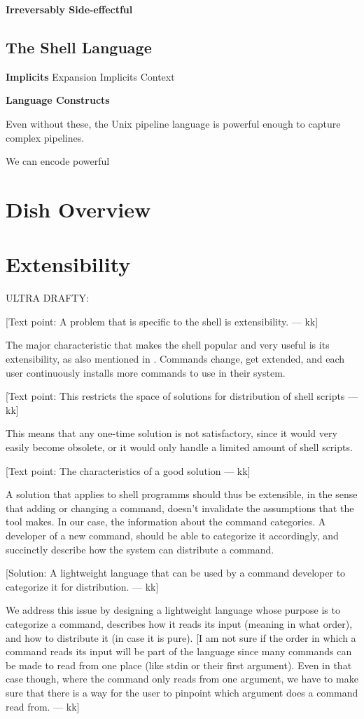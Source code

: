 \documentclass[sigplan,10pt,review,anonymous]{acmart}
\newcommand{\heading}[1]{\vspace{4pt}\noindent\textbf{#1}\enspace}
\newcommand{\kk}[1]{[{\color{magenta}#1 --- kk}]}
\begin{document}
\heading{Irreversably Side-effectful}

\subsection{The Shell Language}
\label{bg:shell}

\heading{Implicits}
Expansion
Implicits
Context

\heading{Language Constructs}

Even without these, the Unix pipeline language is powerful enough to capture complex pipelines.

We can encode powerful

\section{Dish Overview}


\section{Extensibility}

ULTRA DRAFTY:

\kk{Text point: A problem that is specific to the shell is
  extensibility.}

The major characteristic that makes the shell popular and very useful
is its extensibility, as also mentioned in . Commands change,
get extended, and each user continuously installs more commands to use
in their system.

\kk{Text point: This restricts the space of solutions for distribution
  of shell scripts}

This means that any one-time solution is not satisfactory, since it
would very easily become obsolete, or it would only handle a limited
amount of shell scripts.

\kk{Text point: The characteristics of a good solution}

A solution that applies to shell programms should thus be extensible,
in the sense that adding or changing a command, doesn't invalidate the
assumptions that the tool makes. In our case, the information about
the command categories. A developer of a new command, should be able
to categorize it accordingly, and succinctly describe how the system
can distribute a command.

\kk{Solution: A lightweight language that can be used by a command
  developer to categorize it for distribution.}

We address this issue by designing a lightweight language whose
purpose is to categorize a command, describes how it reads its input
(meaning in what order), and how to distribute it (in case it is
pure). \kk{I am not sure if the order in which a command reads its
  input will be part of the language since many commands can be made
  to read from one place (like stdin or their first argument). Even in
  that case though, where the command only reads from one argument, we
  have to make sure that there is a way for the user to pinpoint which
  argument does a command read from.}
\end{document}
